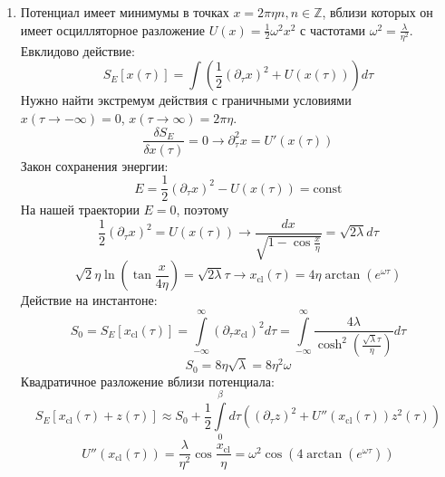 \documentclass[12pt]{article}
\theoremstyle{definition}
\begin{document}
\begin{enumerate}
    \item Потенциал имеет минимумы в точках $x=2\pi\eta n,n\in\mathbb{Z}$, вблизи которых он имеет осцилляторное разложение $U(x)=\frac{1}{2}\omega^2x^2$ с частотами $\omega^2=\frac{\lambda}{\eta^2}$. Евклидово действие:
    \begin{equation}
        S_E[x(\tau)]=\int\left(\frac{1}{2}(\partial_\tau x)^2+U(x(\tau))\right)d\tau
    \end{equation}
    Нужно найти экстремум действия с граничными условиями $x(\tau\rightarrow-\infty)=0$, $x(\tau\rightarrow\infty)=2\pi\eta$.
    \begin{equation}
        \frac{\delta S_E}{\delta x(\tau)}=0\rightarrow \partial^2_\tau x=U'(x(\tau))
    \end{equation}
    Закон сохранения энергии:
    \begin{equation}
        E=\frac{1}{2}(\partial_\tau x)^2-U(x(\tau))=\text{const}
    \end{equation}
    На нашей траектории $E=0$, поэтому
    \begin{equation}
        \frac{1}{2}(\partial_\tau x)^2=U(x(\tau))\rightarrow\frac{dx}{\sqrt{1-\cos\frac{x}{\eta}}}=\sqrt{2\lambda}d\tau
    \end{equation}
    \begin{equation}
        \sqrt{2}\eta\ln\left(\tan\frac{x}{4\eta}\right)=\sqrt{2\lambda}\tau\rightarrow \boxed{x_\text{cl}(\tau)=4\eta\arctan\left(e^{\omega\tau}\right)}
    \end{equation}
    Действие на инстантоне:
    \begin{equation}
        S_0=S_E[x_\text{cl}(\tau)]=\int\limits_{-\infty}^\infty(\partial_\tau x_\text{cl})^2d\tau=\int\limits_{-\infty}^\infty\frac{4\lambda}{\cosh^2\left(\frac{\sqrt{\lambda}\tau}{\eta}\right)}d\tau
    \end{equation}
    \begin{equation}
        \boxed{S_0=8\eta\sqrt{\lambda}=8\eta^2\omega}
    \end{equation}
    Квадратичное разложение вблизи потенциала:
    \begin{equation}
        S_E[x_\text{cl}(\tau)+z(\tau)]\approx S_0+\frac{1}{2}\int\limits_0^\beta d\tau((\partial_\tau z)^2+U''(x_\text{cl}(\tau))z^2(\tau))
    \end{equation}
    \begin{equation}
        U''(x_\text{cl}(\tau))=\frac{\lambda}{\eta^2}\cos\frac{x_\text{cl}}{\eta}=\omega^2\cos\left(4\arctan\left(e^{\omega\tau}\right)\right)

\end{equation}
\end{enumerate}
\end{document}
